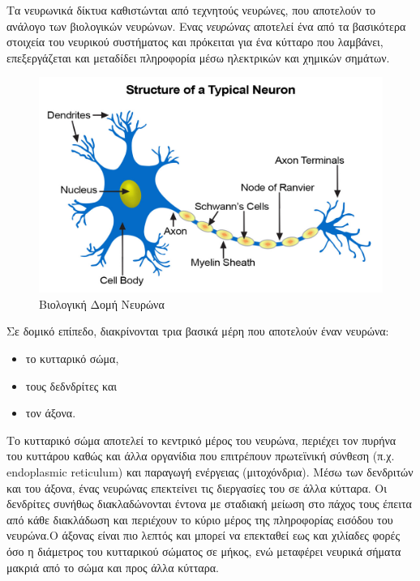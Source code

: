 Τα νευρωνικά δίκτυα καθιστώνται από τεχνητούς νευρώνες, που αποτελούν το ανάλογο των βιολογικών νευρώνων. Ενας \textit{νευρώνας} αποτελεί ένα από τα βασικότερα στοιχεία του νευρικού συστήματος και πρόκειται για ένα κύτταρο που λαμβάνει, επεξεργάζεται και μεταδίδει πληροφορία μέσω ηλεκτρικών και χημικών σημάτων.

\medskip
\begin{figure}[h]
  \centering
  \includegraphics[scale=0.95]{images/neuron-structure.jpg}
  \caption{Βιολογική Δομή Νευρώνα}
  \label{fig:neuron-structure}
\end{figure}

\medskip
Σε δομικό επίπεδο, διακρίνονται τρια βασικά μέρη που αποτελούν έναν νευρώνα:

\begin{itemize}
    \item το κυτταρικό σώμα,
    \item τους δεδνδρίτες και
    \item τον άξονα.
\end{itemize}

\medskip
Το κυτταρικό σώμα αποτελεί το κεντρικό μέρος του νευρώνα, περιέχει τον πυρήνα του κυττάρου καθώς και άλλα οργανίδια που επιτρέπουν πρωτεϊνική σύνθεση (π.χ. endoplasmic reticulum) και παραγωγή ενέργειας (μιτοχόνδρια). Μέσω των δενδριτών και του άξονα, ένας νευρώνας επεκτείνει τις διεργασίες του σε άλλα κύτταρα. Οι δενδρίτες συνήθως διακλαδώνονται έντονα με σταδιακή μείωση στο πάχος τους έπειτα από κάθε διακλάδωση και περιέχουν το κύριο μέρος της πληροφορίας εισόδου του νευρώνα.Ο άξονας είναι πιο λεπτός και μπορεί να επεκταθεί εως και χιλίαδες φορές όσο η διάμετρος του κυτταρικού σώματος σε μήκος, ενώ μεταφέρει νευρικά σήματα μακριά από το σώμα και προς άλλα κύτταρα.

